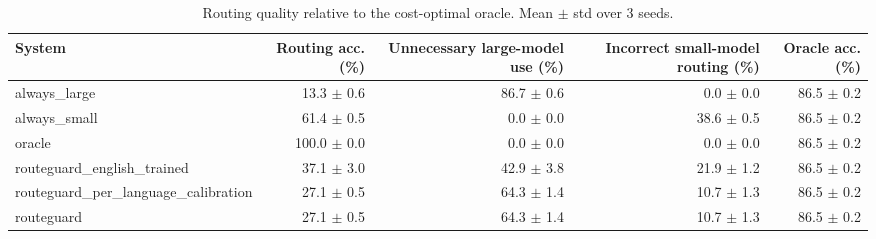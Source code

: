 \begin{table}[t]
\centering
\small
\caption{Routing quality relative to the cost-optimal oracle. Mean $\pm$ std over 3 seeds.}
\label{tab:routing}
\begin{tabular}{lrrrr}
\toprule
System & Routing acc. (\%) & Unnecessary large-model use (\%) & Incorrect small-model routing (\%) & Oracle acc. (\%) \\
\midrule
always\_large & 13.3 $\pm$ 0.6 & 86.7 $\pm$ 0.6 & 0.0 $\pm$ 0.0 & 86.5 $\pm$ 0.2 \\
always\_small & 61.4 $\pm$ 0.5 & 0.0 $\pm$ 0.0 & 38.6 $\pm$ 0.5 & 86.5 $\pm$ 0.2 \\
oracle & 100.0 $\pm$ 0.0 & 0.0 $\pm$ 0.0 & 0.0 $\pm$ 0.0 & 86.5 $\pm$ 0.2 \\
routeguard\_english\_trained & 37.1 $\pm$ 3.0 & 42.9 $\pm$ 3.8 & 21.9 $\pm$ 1.2 & 86.5 $\pm$ 0.2 \\
routeguard\_per\_language\_calibration & 27.1 $\pm$ 0.5 & 64.3 $\pm$ 1.4 & 10.7 $\pm$ 1.3 & 86.5 $\pm$ 0.2 \\
routeguard & 27.1 $\pm$ 0.5 & 64.3 $\pm$ 1.4 & 10.7 $\pm$ 1.3 & 86.5 $\pm$ 0.2 \\
\bottomrule
\end{tabular}
\end{table}

